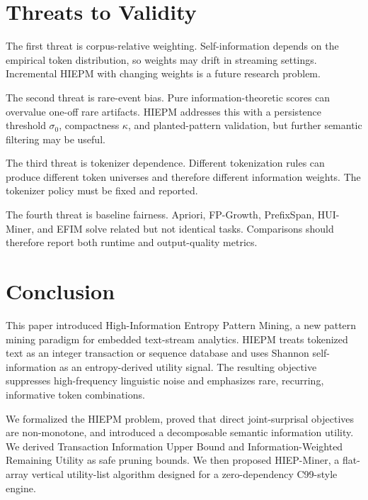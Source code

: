 \documentclass[11pt,a4paper]{article}
\begin{document}
\section{Threats to Validity}

The first threat is corpus-relative weighting. Self-information depends on the empirical token distribution, so weights may drift in streaming settings. Incremental HIEPM with changing weights is a future research problem.

The second threat is rare-event bias. Pure information-theoretic scores can overvalue one-off rare artifacts. HIEPM addresses this with a persistence threshold \(\sigma_0\), compactness \(\kappa\), and planted-pattern validation, but further semantic filtering may be useful.

The third threat is tokenizer dependence. Different tokenization rules can produce different token universes and therefore different information weights. The tokenizer policy must be fixed and reported.

The fourth threat is baseline fairness. Apriori, FP-Growth, PrefixSpan, HUI-Miner, and EFIM solve related but not identical tasks. Comparisons should therefore report both runtime and output-quality metrics.

\section{Conclusion}

This paper introduced High-Information Entropy Pattern Mining, a new pattern mining paradigm for embedded text-stream analytics. HIEPM treats tokenized text as an integer transaction or sequence database and uses Shannon self-information as an entropy-derived utility signal. The resulting objective suppresses high-frequency linguistic noise and emphasizes rare, recurring, informative token combinations.

We formalized the HIEPM problem, proved that direct joint-surprisal objectives are non-monotone, and introduced a decomposable semantic information utility. We derived Transaction Information Upper Bound and Information-Weighted Remaining Utility as safe pruning bounds. We then proposed HIEP-Miner, a flat-array vertical utility-list algorithm designed for a zero-dependency C99-style engine.
\end{document}
